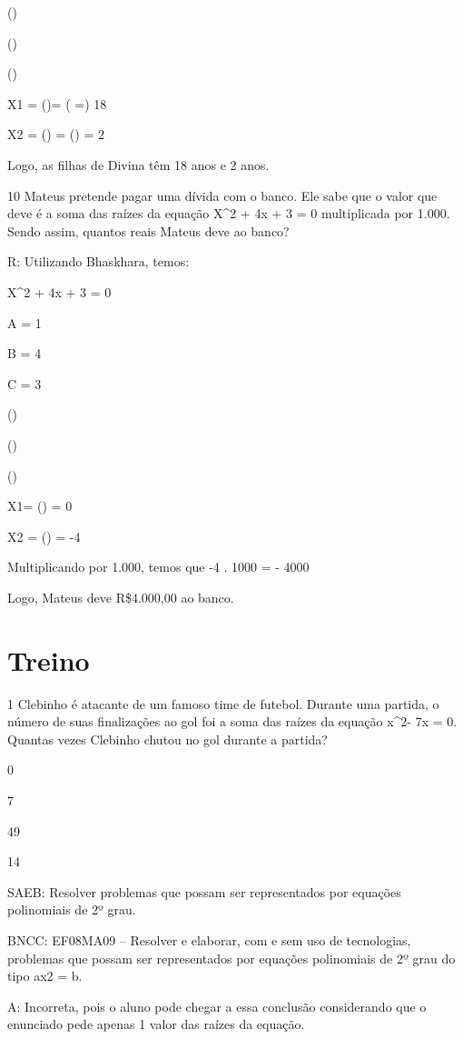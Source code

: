 {()

()

()

X1 = ()= ( =) 18

X2 = () = () = 2

Logo, as filhas de Divina têm 18 anos e 2 anos.

\num{10} Mateus pretende pagar uma dívida com o banco. Ele sabe que o valor
que deve é a soma das raízes da equação X^2 + 4x + 3 = 0 multiplicada por
1.000. Sendo assim, quantos reais Mateus deve ao banco?

R: Utilizando Bhaskhara, temos:

X^2 + 4x + 3 = 0

A = 1

B = 4

C = 3

()

()

()

X1= () = 0

X2 = () = -4

Multiplicando por 1.000, temos que -4 . 1000 = - 4000

Logo, Mateus deve R\$4.000,00 ao banco.

\section{Treino}

\num{1} Clebinho é atacante de um famoso time de futebol. Durante uma
partida, o número de suas finalizações ao gol foi a soma das raízes da
equação x^2- 7x = 0. Quantas vezes Clebinho chutou no gol durante a
partida?
\item 0
\item 7
\item 49
\item 14

SAEB: Resolver problemas que possam ser representados por equações
polinomiais de 2º grau.

BNCC: EF08MA09 -- Resolver e elaborar, com e sem uso de tecnologias,
problemas que possam ser representados por equações polinomiais de 2º
grau do tipo ax2 = b.

A: Incorreta, pois o aluno pode chegar a essa conclusão considerando que
o enunciado pede apenas 1 valor das raízes da equação.

}
